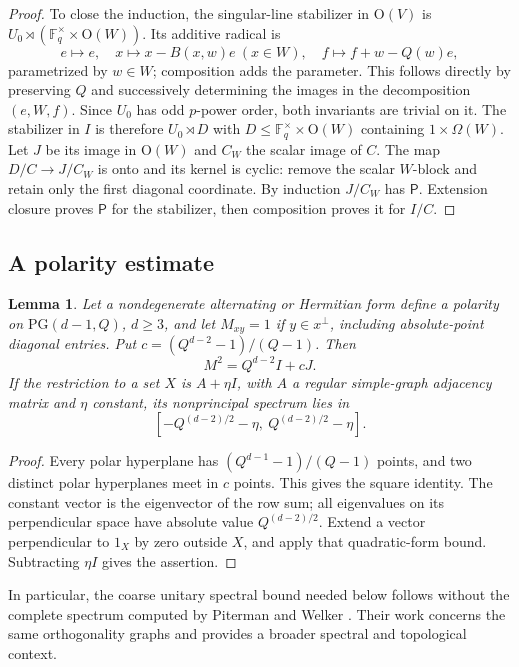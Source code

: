 \documentclass[11pt]{article}
\newtheorem{lemma}[theorem]{Lemma}
\theoremstyle{definition}
\newcommand{\F}{\mathbb F}
\newcommand{\Pp}{\mathsf P}
\newcommand{\Ogrp}{\mathrm O}
\newcommand{\PG}{\mathrm{PG}}
\begin{document}
\begin{proof}
To close the induction, the singular-line stabilizer in $\Ogrp(V)$ is $U_0\rtimes(\F_q^\times\times\Ogrp(W))$. Its additive radical is
\[
e\mapsto e,\quad x\mapsto x-B(x,w)e\ (x\in W),\quad f\mapsto f+w-Q(w)e,
\]
parametrized by $w\in W$; composition adds the parameter. This follows directly by preserving $Q$ and successively determining the images in the decomposition $(e,W,f)$. Since $U_0$ has odd $p$-power order, both invariants are trivial on it. The stabilizer in $I$ is therefore $U_0\rtimes D$ with $D\le\F_q^\times\times\Ogrp(W)$ containing $1\times\Omega(W)$. Let $J$ be its image in $\Ogrp(W)$ and $C_W$ the scalar image of $C$. The map $D/C\to J/C_W$ is onto and its kernel is cyclic: remove the scalar $W$-block and retain only the first diagonal coordinate. By induction $J/C_W$ has $\Pp$. Extension closure proves $\Pp$ for the stabilizer, then composition proves it for $I/C$.
\end{proof}

\subsection{A polarity estimate}
\begin{lemma}\label{lem:polarity}
Let a nondegenerate alternating or Hermitian form define a polarity on $\PG(d-1,Q)$, $d\ge3$, and let $M_{xy}=1$ if $y\in x^\perp$, including absolute-point diagonal entries. Put $c=(Q^{d-2}-1)/(Q-1)$. Then
\[
M^2=Q^{d-2}I+cJ.
\]
If the restriction to a set $X$ is $A+\eta I$, with $A$ a regular simple-graph adjacency matrix and $\eta$ constant, its nonprincipal spectrum lies in
\[
[-Q^{(d-2)/2}-\eta,\ Q^{(d-2)/2}-\eta].
\]
\end{lemma}
\begin{proof}
Every polar hyperplane has $(Q^{d-1}-1)/(Q-1)$ points, and two distinct polar hyperplanes meet in $c$ points. This gives the square identity. The constant vector is the eigenvector of the row sum; all eigenvalues on its perpendicular space have absolute value $Q^{(d-2)/2}$. Extend a vector perpendicular to $1_X$ by zero outside $X$, and apply that quadratic-form bound. Subtracting $\eta I$ gives the assertion.
\end{proof}
In particular, the coarse unitary spectral bound needed below follows without the complete spectrum computed by Piterman and Welker \cite{PW}. Their work concerns the same orthogonality graphs and provides a broader spectral and topological context.
\end{document}
